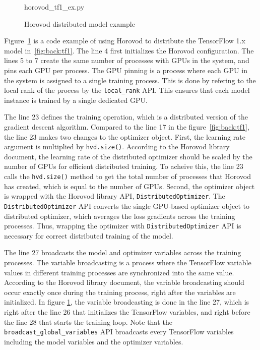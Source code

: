\begin{figure}[ht!]
 
{horovod_tf1_ex.py}
  \caption{Horovod distributed model example}
\label{fig:back:hvd1} 
\end{figure}

Figure~\ref{fig:back:hvd1} is a code example of using Horovod to distribute
the TensorFlow 1.x model in~\ref{fig:back:tf1}.
The line 4 first initializes the Horovod configuration.
The lines 5 to 7 create the same number of processes with GPUs in the system,
and pins each GPU per process. 
The GPU pinning is a process where each GPU in the system is assigned to a 
single training process.
This is done by refering to the local rank of the process 
by the {\tt local\_rank} API.
This ensures that each model instance is trained by a single dedicated GPU.

The line 23 defines the training operation, 
which is a distributed version of the gradient descent algorithm.
Compared to the line 17 in the figure~\ref{fig:back:tf1},
the line 23 makes two changes to the optimizer object.
First, the learning rate argument is multiplied by {\tt hvd.size()}.
According to the Horovod library document,
the learning rate of the distributed optimizer 
should be scaled by the number of GPUs for efficient distributed training.
To acheive this, the line 23 calls the {\tt hvd.size()} method to
get the total number of processes that Horovod has created,
which is equal to the number of GPUs.
Second, the optimizer object is wrapped with the Horovod library API,
{\tt DistributedOptimizer}.
The {\tt DistributedOptimizer} API converts the single GPU-based optimizer 
object to distributed optimizer, which averages the loss gradients across the
training processes.
Thus, wrapping the optimizer with {\tt DistributedOptimizer} API is necessary
for correct distributed training of the model.

The line 27 broadcasts the model and optimizer variables across the training
processes.
The variable broadcasting is a process where the TensorFlow 
variable values in different training processes are synchronized into
the same value.
According to the Horovod library document, the variable broadcasting
should occur exactly once during the training process,
right after the variables are initialized.
In figure \ref{fig:back:hvd1}, the variable broadcasting is done in the line 27,
which is right after the line 26 that initializes the TensorFlow variables,
and right before the line 28 that starts the training loop.
Note that the {\tt broadcast\_global\_variables} API broadcasts every
TensorFlow variables including the model variables and the optimizer
variables.

